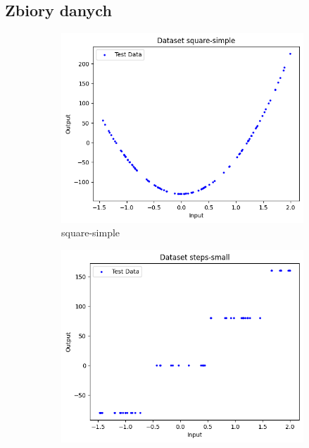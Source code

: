 \documentclass{article}
\begin{document}
\subsection*{Zbiory danych}
\begin{figure}[H]
    \centering
    \begin{subfigure}[b]{0.3\textwidth}
        \centering
        \includegraphics[width=\textwidth]{img/nn2/square-simple.png}
        \caption{square-simple}
    \end{subfigure}
    \hfill
    \begin{subfigure}[b]{0.3\textwidth}
        \centering
        \includegraphics[width=\textwidth]{img/nn2/steps-small.png}

\end{subfigure}
\end{figure}
\end{document}
